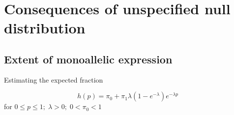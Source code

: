 \documentclass[letterpaper]{article}
\begin{document}
\section{Consequences of unspecified null distribution}
\label{sec:consequences}

\subsection{Extent of monoallelic expression}

Estimating the expected fraction \cite{Storey:2003kx}

\begin{equation}
\label{eq:exp-unif-mixture}
h(p) = \pi_0 + \pi_1 \lambda (1 - e^{-\lambda}) e^{-\lambda p}
\end{equation}
for \(0 \leq p \leq 1; \; \lambda > 0; \; 0 < \pi_0 < 1\)
\end{document}

